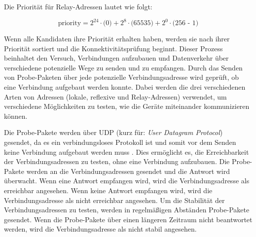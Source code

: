 \noindent Die Priorität für Relay-Adressen lautet wie folgt:

\begin{equation}
    \label{eq:ice_priority_protocol_relay}
    \text{priority} = \text{2}^{24} \cdot \text{(0)} + \text{2}^{8} \cdot \text{(65535)} + \text{2}^{0} \cdot \text{(256 - 1)}
\end{equation}

\noindent Wenn alle Kandidaten ihre Priorität erhalten haben, werden sie nach ihrer Priorität sortiert und die Konnektivitätsprüfung beginnt. Dieser Prozess beinhaltet den Versuch, Verbindungen aufzubauen und Datenverkehr über verschiedene potenzielle Wege zu senden und zu empfangen. Durch das Senden von Probe-Paketen über jede potenzielle Verbindungsadresse wird geprüft, ob eine Verbindung aufgebaut werden konnte. Dabei werden die drei verschiedenen Arten von Adressen (lokale, reflexive und Relay-Adressen) verwendet, um verschiedene Möglichkeiten zu testen, wie die Geräte miteinander kommunizieren können. 

Die Probe-Pakete werden über UDP (kurz für: \textit{User Datagram Protocol}) gesendet, da es ein verbindungsloses Protokoll ist und somit vor dem Senden keine Verbindung aufgebaut werden muss \parencite[S. 1]{rfc768_UDP}. Dies ermöglicht es, die Erreichbarkeit der Verbindungsadressen zu testen, ohne eine Verbindung aufzubauen. Die Probe-Pakete werden an die Verbindungsadressen gesendet und die Antwort wird überwacht. Wenn eine Antwort empfangen wird, wird die Verbindungsadresse als erreichbar angesehen. Wenn keine Antwort empfangen wird, wird die Verbindungsadresse als nicht erreichbar angesehen. Um die Stabilität der Verbindungsadressen zu testen, werden in regelmäßigen Abständen Probe-Pakete gesendet. Wenn die Probe-Pakete über einen längeren Zeitraum nicht beantwortet werden, wird die Verbindungsadresse als nicht stabil angesehen. 

